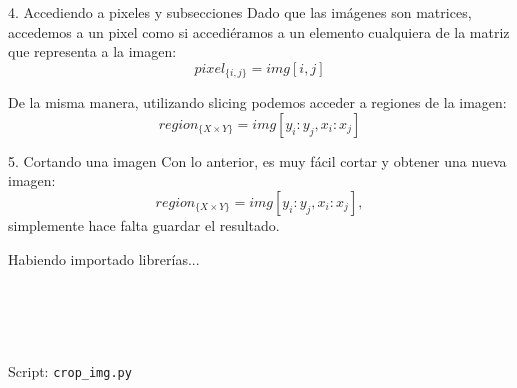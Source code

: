 \documentclass[usenames,dvipsnames]{beamer}
\begin{document}
  \begin{frame}{4. Accediendo a pixeles y subsecciones}
    Dado que las imágenes son matrices, accedemos a un pixel como si accediéramos
    a un elemento cualquiera de la matriz que representa a la imagen:
    $$pixel_{\{i,j\}} = img[i,j]$$

    De la misma manera, utilizando slicing podemos acceder a regiones de la
    imagen:
    $$region_{\{X\times Y\}} = img[y_i:y_j, x_i:x_j]$$
  \end{frame}

  \begin{frame}{5. Cortando una imagen}
    Con lo anterior, es muy fácil cortar y obtener una nueva imagen:
    $$region_{\{X\times Y\}} = img[y_i:y_j, x_i:x_j],$$
    simplemente hace falta guardar el resultado.\\
    \vspace*{0.3cm}
    \begin{block}{Habiendo importado librerías...}
      \\
      \\
      \\
      \\
      \\
      \vspace*{0.5cm}
    \end{block}
    Script: \texttt{crop\_img.py}
  \end{frame}
\end{document}
